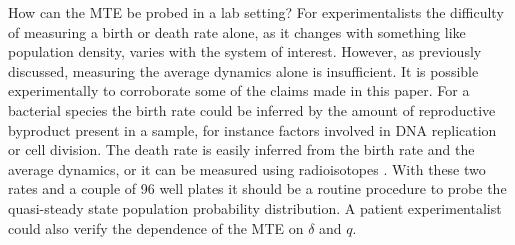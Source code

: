 How can the MTE be probed in a lab setting? 
For experimentalists the difficulty of measuring a birth or death rate alone, as it changes with something like population density, varies with the system of interest. 
However, as previously discussed, measuring the average dynamics alone is insufficient. 
It is possible experimentally to corroborate some of the claims made in this paper. 
For a bacterial species the birth rate could be inferred by the amount of reproductive byproduct present in a sample, for instance factors involved in DNA replication or cell division. %
The death rate is easily inferred from the birth rate and the average dynamics, or it can be measured using radioisotopes \cite{Servais1985}. %
With these two rates and a couple of 96 well plates it should be a routine procedure to probe the quasi-steady state population probability distribution. 
A patient experimentalist could also verify the dependence of the MTE on $\delta$ and $q$.  %

